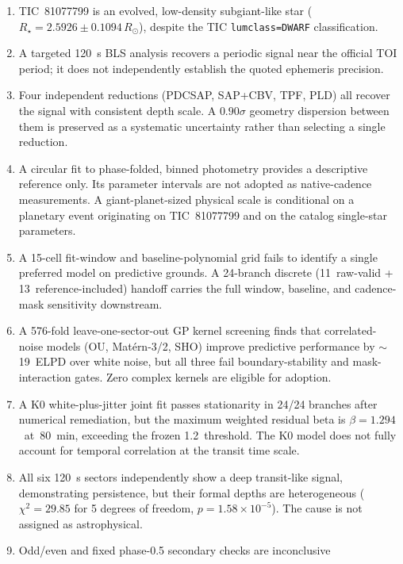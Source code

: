 \documentclass[11pt]{article}
\begin{document}
\begin{enumerate}
  \item TIC~81077799 is an evolved, low-density subgiant-like star
    ($R_\star = 2.5926\pm0.1094\,R_\odot$), despite the TIC
    \texttt{lumclass=DWARF} classification.
  \item A targeted 120~s BLS analysis recovers a periodic signal near the
    official TOI period; it does not independently establish
    the quoted ephemeris precision.
  \item Four independent reductions (PDCSAP, SAP+CBV, TPF, PLD) all recover the
    signal with consistent depth scale.  A $0.90\sigma$ geometry dispersion
    between them is preserved as a systematic uncertainty rather than selecting
    a single reduction.
  \item A circular fit to phase-folded, binned photometry provides a
    descriptive reference only.  Its parameter intervals are not adopted as
    native-cadence measurements.  A giant-planet-sized physical scale is
    conditional on a planetary event originating on TIC~81077799 and on the
    catalog single-star parameters.
  \item A 15-cell fit-window and baseline-polynomial grid fails to identify a
    single preferred model on predictive grounds.  A 24-branch discrete
    (11~raw-valid + 13~reference-included) handoff carries the full window,
    baseline, and cadence-mask sensitivity downstream.
  \item A 576-fold leave-one-sector-out GP kernel screening finds that
    correlated-noise models (OU, Mat\'ern-3/2, SHO) improve predictive
    performance by $\sim$19~ELPD over white noise, but all three fail
    boundary-stability and mask-interaction gates.  Zero complex kernels are
    eligible for adoption.
  \item A K0 white-plus-jitter joint fit passes stationarity in 24/24
    branches after numerical remediation, but the maximum weighted residual
    beta is $\beta=1.294$~at~80~min, exceeding the frozen 1.2~threshold.
    The K0 model does not fully account for temporal correlation at the
    transit time scale.
  \item All six 120~s sectors independently show a deep transit-like signal,
    demonstrating persistence, but their formal depths are heterogeneous
    ($\chi^2=29.85$ for 5 degrees of freedom, $p=1.58\times10^{-5}$).  The
    cause is not assigned as astrophysical.
  \item Odd/even and fixed phase-0.5 secondary checks are inconclusive

\end{enumerate}
\end{document}
